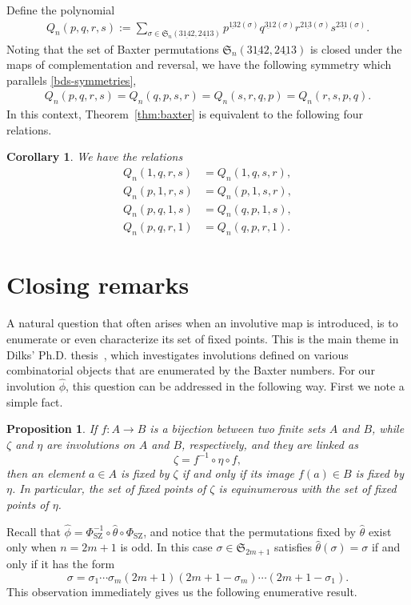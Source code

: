 \documentclass[12pt,reqno]{amsart}
\numberwithin{equation}{section}
\theoremstyle{plain}
\newtheorem{corollary}[theorem]{Corollary}
\newtheorem{proposition}[theorem]{Proposition}
\theoremstyle{definition}
\def\Sym{\mathfrak{S}}
\def\SZ{\mathrm{SZ}}
\def\rasc{\mathrm{2\underline{13}}}
\def\rdes{\mathrm{2\underline{31}}}
\def\ldes{\mathrm{\underline{31}2}}
\def\lasc{\mathrm{\underline{13}2}}
\def\baxter{\mathrm{3\underline{14}2,2\underline{41}3}}
\begin{document}
Define  the  polynomial 
\begin{align}
Q_n(p,q,r,s):=\sum_{\sigma\in\Sym_n(\baxter)}p^{\lasc(\sigma)}q^{\ldes(\sigma)}r^{\rasc(\sigma)}s^{\rdes(\sigma)}.
\end{align}
Noting that the set of Baxter permutations $\Sym_n(\baxter)$ is closed under the maps of complementation and reversal, we have the following symmetry which parallels \eqref{bds-symmetries},
\begin{align}
Q_n(p,q,r,s)=Q_n(q,p,s,r)=Q_n(s,r,q,p)=Q_n(r,s,p,q).
\end{align}
In this context, Theorem~\ref{thm:baxter} is equivalent to the following four relations.
\begin{corollary}
We have the relations
\begin{align}
Q_n(1,q,r,s) &= Q_n(1,q,s,r),\label{eq:baxter equidist"}\\
Q_n(p,1,r,s) &= Q_n(p,1,s,r),\nonumber\\
Q_n(p,q,1,s) &= Q_n(q,p,1,s),\nonumber\\
Q_n(p,q,r,1) &= Q_n(q,p,r,1).\nonumber
\end{align}
\end{corollary}



\section{Closing remarks}
A natural question that often arises when an involutive map is introduced, is to enumerate or even characterize its set of fixed points. This is the main theme in Dilks' Ph.D. thesis~\cite{Dil15}, which investigates involutions defined on various combinatorial objects that are enumerated by the Baxter numbers. For our involution $\widehat\phi$, this question can be addressed in the following way. First we note a simple fact.
\begin{proposition}
If $f:A\to B$ is a bijection between two finite sets $A$ and $B$, while $\zeta$ and $\eta$ are involutions on $A$ and $B$, respectively, and they are linked as 
$$\zeta = f^{-1}\circ\eta\circ f,$$
then an element $a\in A$ is fixed by $\zeta$ if and only if its image $f(a)\in B$ is fixed by $\eta$. In particular, the set of fixed points of $\zeta$ is equinumerous with the set of fixed points of $\eta$.
\end{proposition}

Recall that $\widehat\phi=\Phi_{\SZ}^{-1}\circ\widehat\theta\circ\Phi_{\SZ}$, and notice that the permutations fixed by $\widehat\theta$ exist only when $n=2m+1$ is odd. In this case $\sigma\in\Sym_{2m+1}$ satisfies $\widehat\theta(\sigma)=\sigma$ if and only if it has the form
$$\sigma= \sigma_1\cdots \sigma_m (2m+1) (2m+1-\sigma_m)\cdots(2m+1-\sigma_1).$$
This observation immediately gives us the following enumerative result.
\end{document}
